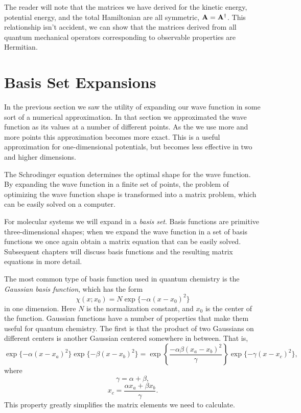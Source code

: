 The reader will note that the matrices we have derived for the kinetic
energy, potential energy, and the total Hamiltonian are all symmetric,
$\mathbf{A} = \mathbf{A}^\dag$.
This relationship isn't accident, we can show that the matrices
derived from all quantum mechanical operators corresponding to
observable properties are Hermitian. 


\section{Basis Set Expansions}
In the previous section we saw the utility of expanding our wave
function in some sort of a numerical approximation. In that section we
approximated the wave function as its values at a number of different
points.  As the we use more and more points this approximation becomes
more exact. This is a useful approximation for one-dimensional
potentials, but becomes less effective in two and higher dimensions.

The Schrodinger equation determines the optimal shape for the wave
function. By expanding the wave function in a finite set of points,
the problem of optimizing the wave function shape is transformed into
a matrix problem, which can be easily solved on a computer.

For molecular systems we will expand in a \emph{basis set}. Basis
functions are primitive three-dimensional shapes; when we expand the
wave function in a set of basis functions we once again obtain a
matrix equation that can be easily solved. Subsequent chapters will
discuss basis functions and the resulting matrix equations in more
detail.

The most common type of basis function used in quantum chemistry is
the \emph{Gaussian basis function}, which has the form
\begin{equation}
 \chi(x;x_0) = N\exp\{-\alpha(x-x_0)^2\}
\end{equation}
in one dimension. Here $N$ is the normalization constant, and $x_0$ is
the center of the function. Gaussian functions have a number of
properties that make them useful for quantum chemistry. The first is
that the product of two Gaussians on different centers is another
Gaussian centered somewhere in between. That is,
\begin{equation}
 \exp\{-\alpha(x-x_a)^2\}\exp\{-\beta(x-x_b)^2\} = 
   \exp\left\{\frac{-\alpha\beta(x_a-x_b)^2}{\gamma}\right\}
   \exp\{-\gamma (x-x_c)^2\},
\end{equation}
where
\begin{equation}
	\gamma = \alpha+\beta,
\end{equation}
\begin{equation}
	x_c = \frac{\alpha x_a+\beta x_b}{\gamma}.
\end{equation}
This property greatly simplifies the matrix elements we need to
calculate.

